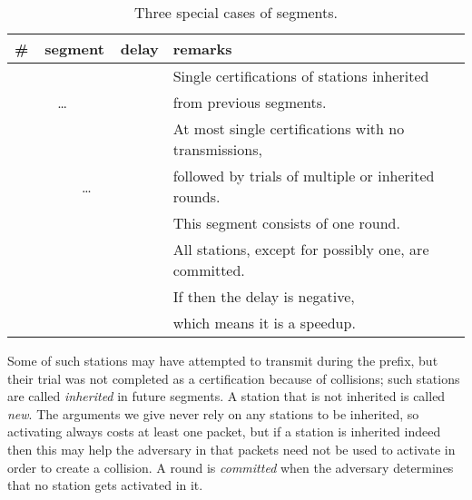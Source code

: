 \documentclass[11pt]{article}
\newcommand{\FF}{\vspace*{\medskipamount}}
\newlength{\pagewidth}
\newcommand{\RB}{\raisebox{2.5ex}{~}}
\newcommand{\LB}{\raisebox{-1.5ex}{~}}
\begin{document}
\begin{table}[tp]
\begin{center}
\begin{tabular}{|c| c  c  c  c | c | l |}
\hline
\RB \LB
 \# & \multicolumn{4}{|c|}{ segment}   & delay & remarks \\
\hline
\hline


\RB \LB
 &  &  &  &  & & 
Single certifications of  stations inherited\\
\LB
 &\underline{} & \ldots & &   &  & 
from previous segments.\\
\hline

\RB \LB
 &  &  &  & &&   
At most  single certifications with no transmissions, \\
\LB
 & &  & \ldots &   &  & 
followed by trials of multiple or inherited rounds.\\
\hline


\RB \LB
 &   & & & &  &   
This segment consists of one round.\\
\RB \LB
 &   & & & &  &   
All stations, except for possibly one, are committed.\\
\RB \LB
 &   & & & &  &   
If  then the delay is negative,\\
\RB \LB
 & \underline{}   & & &  &  & 
which means it is a speedup. \\
\hline

\end{tabular}
\parbox{\pagewidth}{\FF\caption{\label{table-a} 
Three special cases of segments. 
}}
\end{center}
\end{table}



Some of such stations may have attempted to transmit during the prefix, but their trial was not completed as a certification because of collisions; such stations are called \emph{inherited} in future segments.
A station that is not inherited is called \emph{new}.
The arguments we give never rely on any stations to be inherited, so activating always costs at least one packet, but if a station is inherited indeed then this may help the adversary in that packets need not be used to activate in order to create a collision.
A  round is \emph{committed} when the adversary determines that no station gets activated in it.
\end{document}
